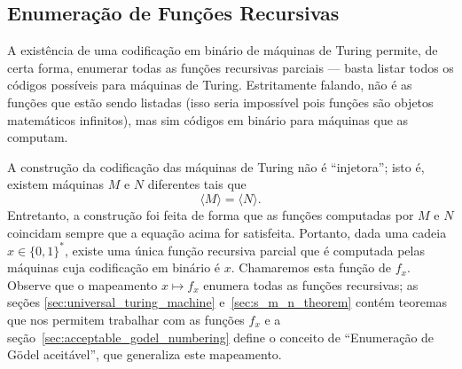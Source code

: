 \subsection{Enumeração de Funções Recursivas}
\label{sec:definition_enumeration_of_recursive_functions}

A existência de uma codificação em binário de máquinas de Turing
permite, de certa forma,
enumerar todas as funções recursivas parciais
--- basta listar todos os códigos possíveis para máquinas de Turing.
Estritamente falando,
não é as funções que estão sendo listadas
(isso seria impossível pois funções são objetos matemáticos infinitos),
mas sim códigos em binário para máquinas que as computam.

A construção da codificação das máquinas de Turing não é ``injetora'';
isto é, existem máquinas $M$ e $N$ diferentes
tais que
\begin{equation*}
    \langle M \rangle = \langle N \rangle.
\end{equation*}
Entretanto,
a construção foi feita de forma que
as funções computadas por $M$ e $N$ coincidam
sempre que a equação acima for satisfeita.
Portanto,
dada uma cadeia $x \in \{0, 1\}^*$,
existe uma única função recursiva parcial
que é computada pelas máquinas cuja codificação em binário é $x$.
Chamaremos esta função de $f_x$.
Observe que o mapeamento $x \mapsto f_x$
enumera todas as funções recursivas;
as seções \ref{sec:universal_turing_machine} e~\ref{sec:s_m_n_theorem}
contém teoremas que nos permitem trabalhar com as funções $f_x$
e a seção~\ref{sec:acceptable_godel_numbering}
define o conceito de ``Enumeração de Gödel aceitável'',
que generaliza este mapeamento.
